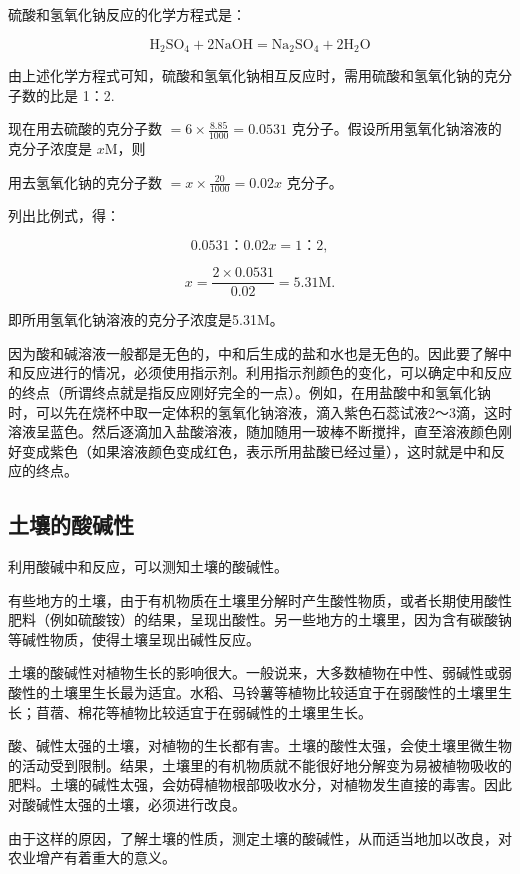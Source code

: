 硫酸和氢氧化钠反应的化学方程式是：

\[
\mathrm{H}_{2} \mathrm{SO}_{4} + 2 \mathrm{NaOH} = \mathrm{Na}_{2} \mathrm{SO}_{4} + 2 \mathrm{H}_{2} \mathrm{O}
\]

由上述化学方程式可知，硫酸和氢氧化钠相互反应时，需用硫酸和氢氧化钠的克分子数的比是
1：2.

现在用去硫酸的克分子数 \(= 6 \times \frac{8.85}{1000} = 0.0531\)
克分子。假设所用氢氧化钠溶液的克分子浓度是 \(x\mathrm{M}\)，则

用去氢氧化钠的克分子数 \(= x \times \frac{20}{1000} = 0.02x\) 克分子。

列出比例式，得：

\[
0.0531\text{：} 0.02 x = 1\text{：} 2,
\]

\[
x = \frac {2 \times 0.0531}{0.02} = 5.31 \mathrm{M}.
\]

即所用氢氧化钠溶液的克分子浓度是5.31M。

因为酸和碱溶液一般都是无色的，中和后生成的盐和水也是无色的。因此要了解中和反应进行的情况，必须使用指示剂。利用指示剂颜色的变化，可以确定中和反应的终点（所谓终点就是指反应刚好完全的一点）。例如，在用盐酸中和氢氧化钠时，可以先在烧杯中取一定体积的氢氧化钠溶液，滴入紫色石蕊试液2～3滴，这时溶液呈蓝色。然后逐滴加入盐酸溶液，随加随用一玻棒不断搅拌，直至溶液颜色刚好变成紫色（如果溶液颜色变成红色，表示所用盐酸已经过量），这时就是中和反应的终点。

\subsection{土壤的酸碱性}

利用酸碱中和反应，可以测知土壤的酸碱性。

有些地方的土壤，由于有机物质在土壤里分解时产生酸性物质，或者长期使用酸性肥料（例如硫酸铵）的结果，呈现出酸性。另一些地方的土壤里，因为含有碳酸钠等碱性物质，使得土壤呈现出碱性反应。

土壤的酸碱性对植物生长的影响很大。一般说来，大多数植物在中性、弱碱性或弱酸性的土壤里生长最为适宜。水稻、马铃薯等植物比较适宜于在弱酸性的土壤里生长；苜蓿、棉花等植物比较适宜于在弱碱性的土壤里生长。

酸、碱性太强的土壤，对植物的生长都有害。土壤的酸性太强，会使土壤里微生物的活动受到限制。结果，土壤里的有机物质就不能很好地分解变为易被植物吸收的肥料。土壤的碱性太强，会妨碍植物根部吸收水分，对植物发生直接的毒害。因此对酸碱性太强的土壤，必须进行改良。

由于这样的原因，了解土壤的性质，测定土壤的酸碱性，从而适当地加以改良，对农业增产有着重大的意义。

